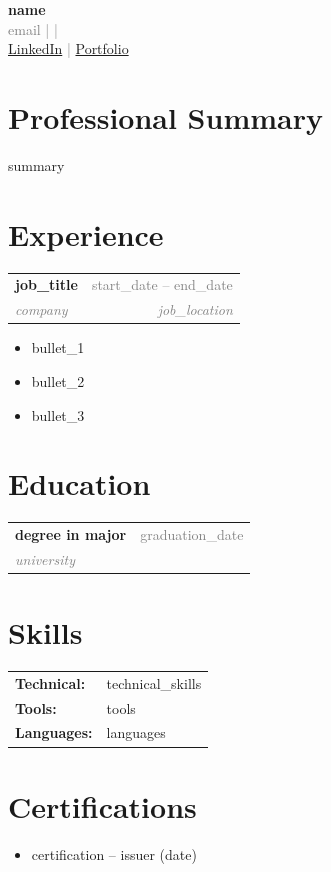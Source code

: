 \documentclass[11pt,a4paper]{article}
\makeatletter
\newcommand{\entry}[4]{%
    \noindent\begin{tabularx}{\textwidth}{@{}Xr@{}}
        \textbf{#1} & \textcolor{gray}{\small #3} \\
        \textit{\textcolor{gray}{#2}} & \textcolor{gray}{\small\textit{#4}}
    \end{tabularx}\vspace{2pt}%
}
\makeatother
\begin{document}
\begin{center}
    {\Huge\bfseries\color{primary} {{name}}} \\[6pt]
    \textcolor{gray}{
        {{email}} \quad |  \quad |  \\
        \href{{{linkedin}}}{LinkedIn} \quad | \quad \href{{{portfolio}}}{Portfolio}
    }
\end{center}
\vspace{8pt}

\section{Professional Summary}
{{summary}}

\section{Experience}

\entry{{{job_title}}}{{{company}}}{{{start_date}} -- {{end_date}}}{{{job_location}}}
\begin{itemize}
    \item {{bullet_1}}
    \item {{bullet_2}}
    \item {{bullet_3}}
\end{itemize}

\section{Education}

\entry{{{degree}} in {{major}}}{{{university}}}{{{graduation_date}}}{}

\section{Skills}
\noindent\begin{tabularx}{\textwidth}{@{}lX@{}}
    \textbf{Technical:} & {{technical_skills}} \\
    \textbf{Tools:}     & {{tools}} \\
    \textbf{Languages:} & {{languages}}
\end{tabularx}

\section{Certifications}
\begin{itemize}
    \item {{certification}} -- {{issuer}} ({{date}})
\end{itemize}
\end{document}
